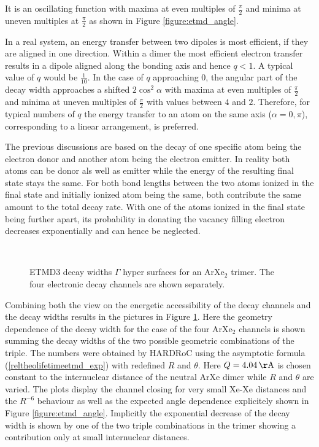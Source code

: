 It is an oscillating function with maxima at even multiples of $\frac \pi 2$
and minima at uneven multiples at $\frac \pi 2$ as shown in Figure
\ref{figure:etmd_angle}.


In a real system, an energy transfer between
two dipoles is most efficient, if they are aligned in one direction.
Within a dimer the most efficient electron transfer results in a
dipole aligned along the bonding axis and hence $q<1$. A typical
value of $q$ would be $\frac 1{10}$. In the 
case of $q$ approaching 0, the angular part of
the decay width
approaches a shifted $2\cos^2 \alpha$ with maxima at even multiples of $\frac \pi2$
and minima at uneven multiples of $\frac \pi2$ with values between
$4$ and $2$.
Therefore, for typical numbers of $q$ the energy transfer
to an atom on the same axis ($\alpha = 0,\pi$), corresponding
to a linear arrangement, is preferred.

The previous discussions are based on the decay of one specific atom
being the electron donor and another atom being the electron emitter.
In reality both atoms can be donor als well as emitter while the energy
of the resulting final state stays the same. For both bond lengths between the
two atoms ionized in the final state and
initially ionized atom being the same, both contribute the same amount
to the total decay rate. With one of the atoms ionized in the final state
being further apart, its probability in donating the vacancy filling electron
decreases exponentially and can hence be neglected.

\begin{figure}[ht]
 \centering
 
 \\
 
 
 \caption{\ac{ETMD}3 decay widths $\Gamma$ hyper surfaces for an ArXe$_2$ trimer.
          The four electronic decay channels are shown separately.}
 \label{figure:ArXe2_etmd_geom_gamma}
\end{figure}


Combining both the view on the energetic accessibility of the decay
channels and the decay widths results in the pictures in
Figure \ref{figure:ArXe2_etmd_geom_gamma}.
Here the geometry dependence of the decay width for the case of the four ArXe$_2$
channels is shown summing the decay widths of the two possible geometric combinations
of the triple.
The numbers were obtained by \ac{HARDRoC} using the
asymptotic formula (\ref{reltheolifetimeetmd_exp}) with redefined
$R$ and $\theta$. Here $Q=\unit[4.04]{\AA}$ is chosen constant
to the internuclear distance of the neutral ArXe dimer while $R$ and $\theta$
are varied. The plots display the channel closing for very small Xe-Xe distances
and the $R^{-6}$ behaviour as well as the expected angle dependence explicitely
shown in Figure \ref{figure:etmd_angle}. Implicitly the exponential decrease
of the decay width is shown by one of the two triple combinations in the trimer
showing a contribution only at small internuclear distances.

